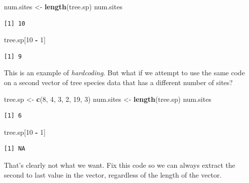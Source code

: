 \documentclass[
]{krantz}
\makeatletter
\newenvironment{Shaded}{\begin{snugshade}}{\end{snugshade}}
\newcommand{\DecValTok}[1]{\textcolor[rgb]{0.06,0.06,0.06}{#1}}
\newcommand{\KeywordTok}[1]{\textcolor[rgb]{0.27,0.27,0.27}{\textbf{#1}}}
\newcommand{\NormalTok}[1]{#1}
\newcommand{\OperatorTok}[1]{\textcolor[rgb]{0.43,0.43,0.43}{\textbf{#1}}}
\newcommand{\StringTok}[1]{\textcolor[rgb]{0.5,0.5,0.5}{#1}}
\newenvironment{kframe}{%
\medskip{}
\setlength{\fboxsep}{.8em}
 \def\at@end@of@kframe{}%
 \ifinner\ifhmode%
  \def\at@end@of@kframe{\end{minipage}}%
  \begin{minipage}{\columnwidth}%
 \fi\fi%
 \def\FrameCommand##1{\hskip\@totalleftmargin \hskip-\fboxsep
 \colorbox{shadecolor}{##1}\hskip-\fboxsep
     \hskip-\linewidth \hskip-\@totalleftmargin \hskip\columnwidth}%
 \MakeFramed {\advance\hsize-\width
   \@totalleftmargin\z@ \linewidth\hsize
   \@setminipage}}%
 {\par\unskip\endMakeFramed%
 \at@end@of@kframe}
\renewenvironment{Shaded}{\begin{kframe}}{\end{kframe}}
\makeatother
\begin{document}
\begin{Shaded}
\begin{Highlighting}[]
\NormalTok{num.sites \textless{}{-}}\StringTok{ }\KeywordTok{length}\NormalTok{(tree.sp)}
\NormalTok{num.sites}
\end{Highlighting}
\end{Shaded}

\begin{verbatim}
[1] 10
\end{verbatim}

\begin{Shaded}
\begin{Highlighting}[]
\NormalTok{tree.sp[}\DecValTok{10} \OperatorTok{{-}}\StringTok{ }\DecValTok{1}\NormalTok{]}
\end{Highlighting}
\end{Shaded}

\begin{verbatim}
[1] 9
\end{verbatim}

This is an example of \emph{hardcoding}. But what if we attempt to use the same code on a second vector of tree species data that has a different number of sites?

\begin{Shaded}
\begin{Highlighting}[]
\NormalTok{tree.sp \textless{}{-}}\StringTok{ }\KeywordTok{c}\NormalTok{(}\DecValTok{8}\NormalTok{, }\DecValTok{4}\NormalTok{, }\DecValTok{3}\NormalTok{, }\DecValTok{2}\NormalTok{, }\DecValTok{19}\NormalTok{, }\DecValTok{3}\NormalTok{)}
\NormalTok{num.sites \textless{}{-}}\StringTok{ }\KeywordTok{length}\NormalTok{(tree.sp)}
\NormalTok{num.sites}
\end{Highlighting}
\end{Shaded}

\begin{verbatim}
[1] 6
\end{verbatim}

\begin{Shaded}
\begin{Highlighting}[]
\NormalTok{tree.sp[}\DecValTok{10} \OperatorTok{{-}}\StringTok{ }\DecValTok{1}\NormalTok{]}
\end{Highlighting}
\end{Shaded}

\begin{verbatim}
[1] NA
\end{verbatim}

That's clearly not what we want. Fix this code so we can always extract the second to last value in the vector, regardless of the length of the vector.
\end{document}
